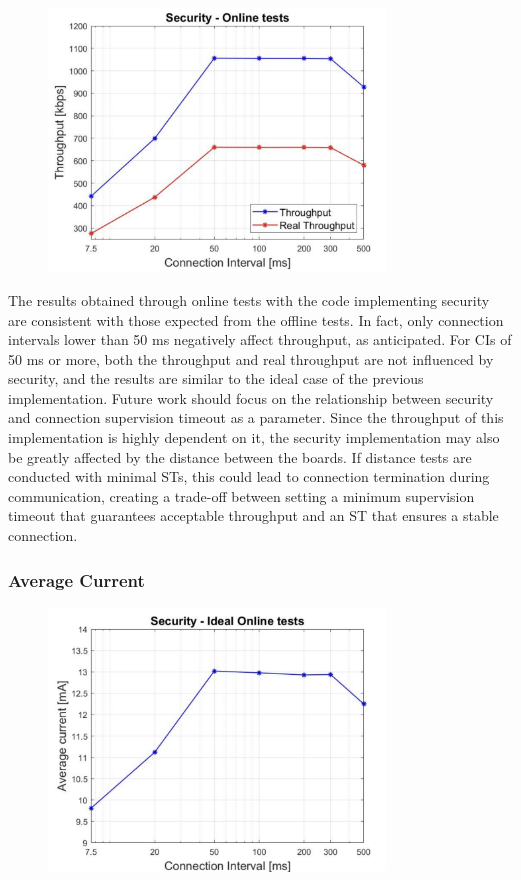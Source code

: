\documentclass{Configuration_Files/PoliMi3i_thesis}
\begin{document}
\begin{figure}[H]
    \centering
    \includegraphics[width=0.8\textwidth]{Results Manuel/figure12}
    \label{fig:figure1}
\end{figure}

The results obtained through online tests with the code implementing security are consistent with those expected from the offline tests. In fact, only connection intervals lower than 50 ms negatively affect throughput, as anticipated. For CIs of 50 ms or more, both the throughput and real throughput are not influenced by security, and the results are similar to the ideal case of the previous implementation. Future work should focus on the relationship between security and connection supervision timeout as a parameter. Since the throughput of this implementation is highly dependent on it, the security implementation may also be greatly affected by the distance between the boards. If distance tests are conducted with minimal STs, this could lead to connection termination during communication, creating a trade-off between setting a minimum supervision timeout that guarantees acceptable throughput and an ST that ensures a stable connection.

\subsubsection*{Average Current}

\begin{figure}[H]
    \centering
    \includegraphics[width=0.8\textwidth]{Results Manuel/figure13}
    \label{fig:figure1}
\end{figure}
\end{document}
